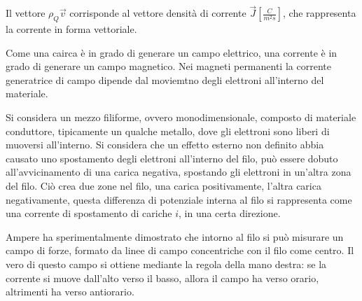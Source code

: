 \documentclass{article}
\numberwithin{equation}{subsection}
\begin{document}
Il vettore $\rho_Q\vec{v}$ corrisponde al vettore densità di corrente $\vec{J}\displaystyle\left[\frac{C}{m^2s}\right]$, che rappresenta la corrente in forma vettoriale. 



Come una cairca è in grado di generare un campo elettrico, una corrente è in grado di generare un campo magnetico. Nei magneti permanenti la corrente generatrice di campo 
dipende dal moviemtno degli elettroni all'interno del materiale. 

Si considera un mezzo filiforme, ovvero monodimensionale, composto di materiale conduttore, tipicamente un qualche 
metallo, dove gli elettroni sono liberi di muoversi all'interno. Si considera che un effetto esterno non definito abbia causato uno spostamento degli elettroni all'interno del filo, 
può essere dobuto all'avvicinamento di una carica negativa, spostando gli elettroni in un'altra zona del filo. Ciò crea due zone nel filo, una carica positivamente, l'altra 
carica negativamente, questa differenza di potenziale interna al filo si rappresenta come una corrente di spostamento di cariche $i$, in una certa direzione. 

Ampere ha sperimentalmente dimostrato che intorno al filo si può misurare un campo di forze, formato da linee di campo concentriche con il filo come centro. Il vero di questo 
campo si ottiene mediante la regola della mano destra: se la corrente si muove dall'alto verso il basso, allora il campo ha verso orario, altrimenti ha verso antiorario. 

\begin{center}
\end{center}
\end{document}
